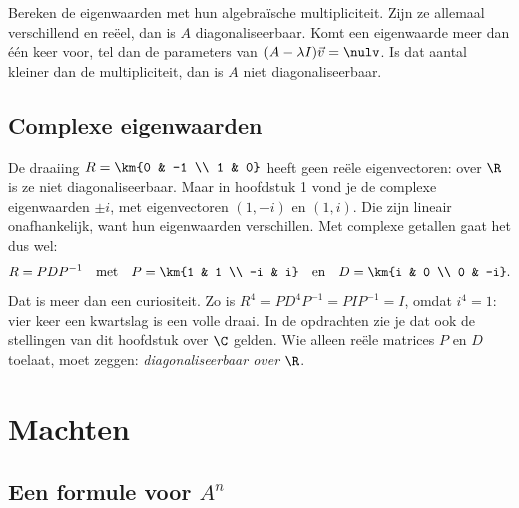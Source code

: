 \begin{werkwijze}
Bereken de eigenwaarden met hun algebraïsche multipliciteit. Zijn ze allemaal verschillend en reëel, dan is $A$ diagonaliseerbaar. Komt een eigenwaarde meer dan één keer voor, tel dan de parameters van $(A - \lambda I)\vec v = \nulv$. Is dat aantal kleiner dan de multipliciteit, dan is $A$ niet diagonaliseerbaar.
\end{werkwijze}


\begin{oefeningen}
\end{oefeningen}

\subsection{Complexe eigenwaarden}

De draaiing $R = \km{0 & -1 \\ 1 & 0}$ heeft geen reële eigenvectoren: over $\R$ is ze niet diagonaliseerbaar. Maar in hoofdstuk 1 vond je de complexe eigenwaarden $\pm i$, met eigenvectoren $(1, -i)$ en $(1, i)$. Die zijn lineair onafhankelijk, want hun eigenwaarden verschillen. Met complexe getallen gaat het dus wel:
\[ R = PDP^{-1} \quad \text{met} \quad P = \km{1 & 1 \\ -i & i} \quad \text{en} \quad D = \km{i & 0 \\ 0 & -i} . \]
Dat is meer dan een curiositeit. Zo is $R^4 = PD^4P^{-1} = PIP^{-1} = I$, omdat $i^4 = 1$: vier keer een kwartslag is een volle draai. In de opdrachten zie je dat ook de stellingen van dit hoofdstuk over $\C$ gelden. Wie alleen reële matrices $P$ en $D$ toelaat, moet zeggen: \textit{diagonaliseerbaar over $\R$}.

\begin{oefeningen}
\end{oefeningen}

\section{Machten}

\subsection{Een formule voor \texorpdfstring{$A^n$}{A tot de n}}

